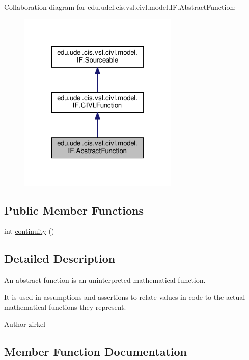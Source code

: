Collaboration diagram for edu.\+udel.\+cis.\+vsl.\+civl.\+model.\+I\+F.\+Abstract\+Function\+:
\nopagebreak
\begin{figure}[H]
\begin{center}
\leavevmode
\includegraphics[width=215pt]{interfaceedu_1_1udel_1_1cis_1_1vsl_1_1civl_1_1model_1_1IF_1_1AbstractFunction__coll__graph}
\end{center}
\end{figure}
\subsection*{Public Member Functions}
\begin{DoxyCompactItemize}
\item 
int \hyperlink{interfaceedu_1_1udel_1_1cis_1_1vsl_1_1civl_1_1model_1_1IF_1_1AbstractFunction_ac364c585cac93fe061aad0e2ac7c9ce7}{continuity} ()
\end{DoxyCompactItemize}


\subsection{Detailed Description}
An abstract function is an uninterpreted mathematical function. 

It is used in assumptions and assertions to relate values in code to the actual mathematical functions they represent.

\begin{DoxyAuthor}{Author}
zirkel 
\end{DoxyAuthor}


\subsection{Member Function Documentation}
\hypertarget{interfaceedu_1_1udel_1_1cis_1_1vsl_1_1civl_1_1model_1_1IF_1_1AbstractFunction_ac364c585cac93fe061aad0e2ac7c9ce7}{}
